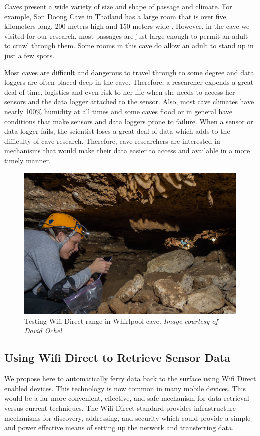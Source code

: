\documentclass[10pt,twocolumn]{article}
\begin{document}
Caves present a wide variety of size and shape of passage and climate. 
For example, Son Doong Cave in Thailand has a large room that is over five kilometers long, 200 meters high and 150 meters wide \cite{sondoong}.
However, in the cave we visited for our research, most passages are just large enough to permit an adult to crawl through them.
Some rooms in this cave do allow an adult to stand up in just a few spots.

Most caves are difficult and dangerous to travel through to some degree and data loggers are often placed deep in the cave.
Therefore, a researcher expends a great deal of time, logistics and even risk to her life when she needs to access her sensors and the data logger attached to the sensor.
Also, most cave climates have nearly 100\% humidity at all times and some caves flood or in general have conditions that make sensors and data loggers prone to failure.
When a sensor or data logger fails, the scientist loses a great deal of data which adds to the difficulty of cave research.
Therefore, cave researchers are interested in mechanisms that would make their data easier to access and available in a more timely manner.

\begin{figure}[t]
\includegraphics[width=\textwidth]{cavewifi2}
\caption{Testing Wifi Direct range in Whirlpool cave. \textit{Image courtesy of David Ochel.}}
\end{figure}

\subsection{Using Wifi Direct to Retrieve Sensor Data}
We propose here to automatically ferry data back to the surface using Wifi Direct enabled devices. 
This technology is now common in many mobile devices.
This would be a far more convenient, effective, and safe mechanism for data retrieval versus current techniques.  
The Wifi Direct standard provides infrastructure mechanisms for discovery, addressing, and security which could 
provide a simple and power effective means of setting up the network and transferring data. 
\end{document}
